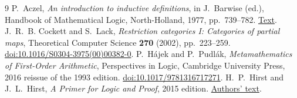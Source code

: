 \documentclass[11pt]{article}
\theoremstyle{definition}\newtheorem{definition}[theorem]{Definition}
\begin{document}
\begin{thebibliography}{9}
P.~Aczel, \emph{An introduction to inductive definitions},
in J.~Barwise (ed.), Handbook of Mathematical Logic,
North-Holland, 1977, pp.~739--782.
\href{https://lawrencecpaulson.github.io/papers/Aczel-Inductive-Defs.pdf}{Text}.
J.~R.~B. Cockett and S.~Lack, \emph{Restriction categories I:
Categories of partial maps}, Theoretical Computer Science
\textbf{270} (2002), pp.~223--259.
\href{https://doi.org/10.1016/S0304-3975(00)00382-0}{doi:10.1016/S0304-3975(00)00382-0}.
P.~H\'ajek and P.~Pudl\'ak, \emph{Metamathematics of First-Order
Arithmetic}, Perspectives in Logic, Cambridge University Press,
2016 reissue of the 1993 edition.
\href{https://doi.org/10.1017/9781316717271}{doi:10.1017/9781316717271}.
H.~P.~Hirst and J.~L.~Hirst, \emph{A Primer for Logic and Proof},
2015 edition.
\href{https://www.appstate.edu/~hirstjl/primer/hirst.pdf}{Authors' text}.
\end{thebibliography}
\end{document}
